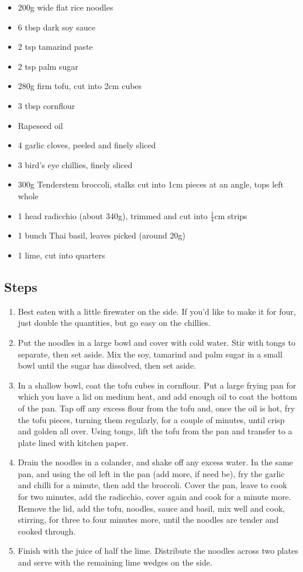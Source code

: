 \documentclass{book}
\begin{document}
\begin{itemize}
\item 200g wide flat rice noodles
\item 6 tbsp dark soy sauce
\item 2 tsp tamarind paste
\item 2 tsp palm sugar
\item 280g firm tofu, cut into 2cm cubes
\item 3 tbsp cornflour
\item Rapeseed oil
\item 4 garlic cloves, peeled and finely sliced
\item 3 bird’s eye chillies, finely sliced
\item 300g Tenderstem broccoli, stalks cut into 1cm pieces at an angle, tops left whole
\item 1 head radicchio (about 340g), trimmed and cut into $\frac{1}{4}$cm strips
\item 1 bunch Thai basil, leaves picked (around 20g)
\item 1 lime, cut into quarters
\end{itemize}

\subsection*{Steps}
\begin{enumerate}
\item Best eaten with a little firewater on the side. If you’d like to make it for four, just double the quantities, but go easy on the chillies.
\item Put the noodles in a large bowl and cover with cold water. Stir with tongs to separate, then set aside. Mix the soy, tamarind and palm sugar in a small bowl until the sugar has dissolved, then set aside.
\item In a shallow bowl, coat the tofu cubes in cornflour. Put a large frying pan for which you have a lid on medium heat, and add enough oil to coat the bottom of the pan. Tap off any excess flour from the tofu and, once the oil is hot, fry the tofu pieces, turning them regularly, for a couple of minutes, until crisp and golden all over. Using tongs, lift the tofu from the pan and transfer to a plate lined with kitchen paper.
\item Drain the noodles in a colander, and shake off any excess water. In the same pan, and using the oil left in the pan (add more, if need be), fry the garlic and chilli for a minute, then add the broccoli. Cover the pan, leave to cook for two minutes, add the radicchio, cover again and cook for a minute more. Remove the lid, add the tofu, noodles, sauce and basil, mix well and cook, stirring, for three to four minutes more, until the noodles are tender and cooked through.
\item Finish with the juice of half the lime. Distribute the noodles across two plates and serve with the remaining lime wedges on the side.
\end{enumerate}
\newpage
\end{document}
